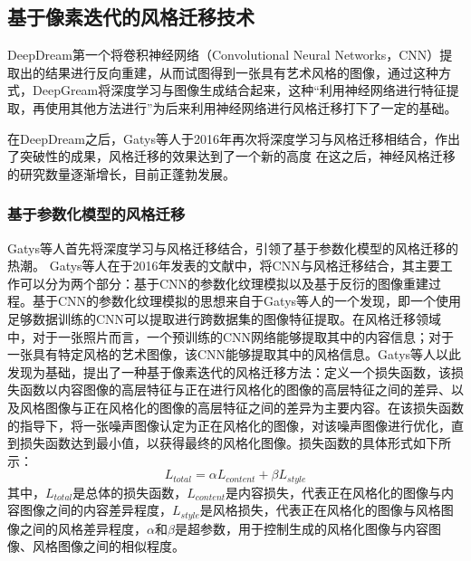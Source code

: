 \subsection{基于像素迭代的风格迁移技术}

DeepDream\cite{mordvintsevInceptionismGoingDeeper2015}第一个将卷积神经网络（Convolutional Neural Networks，CNN）提取出的结果进行反向重建，从而试图得到一张具有艺术风格的图像\cite{jingNeuralStyleTransfer2020}，通过这种方式，DeepGream将深度学习与图像生成结合起来，这种“利用神经网络进行特征提取，再使用其他方法进行”为后来利用神经网络进行风格迁移打下了一定的基础。

在DeepDream之后，Gatys等人\cite{gatysImageStyleTransfer2016}于2016年再次将深度学习与风格迁移相结合，作出了突破性的成果，风格迁移的效果达到了一个新的高度%
在这之后，神经风格迁移的研究数量逐渐增长，目前正蓬勃发展。


\subsubsection{基于参数化模型的风格迁移}

Gatys等人\cite{gatysImageStyleTransfer2016}首先将深度学习与风格迁移结合，引领了基于参数化模型的风格迁移的热潮。
Gatys等人在于2016年发表的文献\cite{gatysImageStyleTransfer2016}中，将CNN与风格迁移结合，其主要工作可以分为两个部分：基于CNN的参数化纹理模拟以及基于反衍的图像重建过程\cite{gatysImageStyleTransfer2016}。基于CNN的参数化纹理模拟的思想来自于Gatys等人的一个发现，即一个使用足够数据训练的CNN可以提取进行跨数据集的图像特征提取\cite{gatysImageStyleTransfer2016}。在风格迁移领域中，对于一张照片而言，一个预训练的CNN网络能够提取其中的内容信息；对于一张具有特定风格的艺术图像，该CNN能够提取其中的风格信息。Gatys等人以此发现为基础，提出了一种基于像素迭代的风格迁移方法：定义一个损失函数，该损失函数以内容图像的高层特征与正在进行风格化的图像的高层特征之间的差异、以及风格图像与正在风格化的图像的高层特征之间的差异为主要内容。在该损失函数的指导下，将一张噪声图像认定为正在风格化的图像，对该噪声图像进行优化，直到损失函数达到最小值，以获得最终的风格化图像。损失函数的具体形式如下所示：
\begin{equation}
    \label{Gatys_total_loss}
    L_{total}=\alpha L_{content}+ \beta L_{style}
\end{equation}
其中，$L_{total}$是总体的损失函数，$L_{content}$是内容损失，代表正在风格化的图像与内容图像之间的内容差异程度，$L_{style}$是风格损失，代表正在风格化的图像与风格图像之间的风格差异程度，$\alpha$和$\beta$是超参数，用于控制生成的风格化图像与内容图像、风格图像之间的相似程度。

